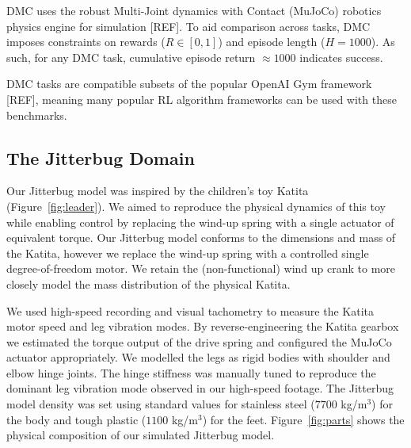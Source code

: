 \documentclass[letterpaper, 10 pt, conference]{ieeeconf}
\begin{document}
DMC uses the robust Multi-Joint dynamics with Contact (MuJoCo) robotics physics engine for simulation [REF].
To aid comparison across tasks, DMC imposes constraints on rewards ($R \in [0, 1]$) and episode length ($H = 1000$).
As such, for any DMC task, cumulative episode return $\approx 1000$ indicates success.

DMC tasks are compatible subsets of the popular OpenAI Gym framework [REF], meaning many popular RL algorithm frameworks can be used with these benchmarks.

\subsection{The Jitterbug Domain}

Our Jitterbug model was inspired by the children's toy Katita (Figure~\ref{fig:leader}).
We aimed to reproduce the physical dynamics of this toy while enabling control by replacing the wind-up spring with a single actuator of equivalent torque.
Our Jitterbug model conforms to the dimensions and mass of the Katita, however we replace the wind-up spring with a controlled single degree-of-freedom motor.
We retain the (non-functional) wind up crank to more closely model the mass distribution of the physical Katita.

We used high-speed recording and visual tachometry to measure the Katita motor speed and leg vibration modes.
By reverse-engineering the Katita gearbox we estimated the torque output of the drive spring and configured the MuJoCo actuator appropriately.
We modelled the legs as rigid bodies with shoulder and elbow hinge joints.
The hinge stiffness was manually tuned to reproduce the dominant leg vibration mode observed in our high-speed footage.
The Jitterbug model density was set using standard values for stainless steel ($7700$ kg/m$^3$) for the body and tough plastic ($1100$ kg/m$^3$) for the feet.
Figure~\ref{fig:parts} shows the physical composition of our simulated Jitterbug model.
\end{document}
